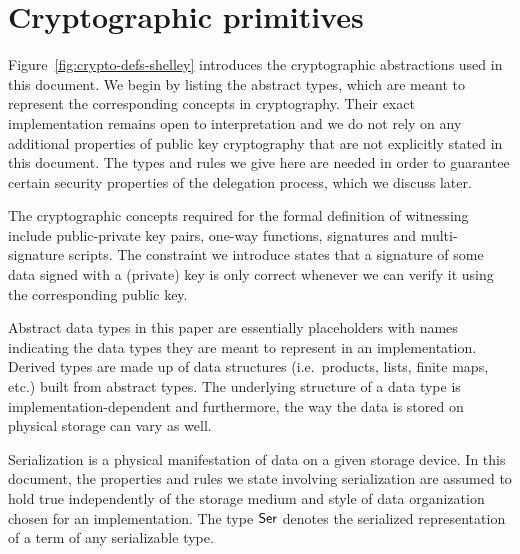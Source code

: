 \section{Cryptographic primitives}
\label{sec:crypto-primitives-shelley}

Figure~\ref{fig:crypto-defs-shelley} introduces the cryptographic abstractions used in
this document. We begin by listing the abstract types, which are meant to
represent the corresponding concepts in cryptography.
Their exact
implementation remains open to interpretation and we do not rely on
any additional properties of public key cryptography that are not explicitly stated
in this document. The types and rules we give here are needed in
order to guarantee certain security properties of the delegation process, which
we discuss later.

The cryptographic concepts required for the formal definition of witnessing
include public-private key pairs, one-way functions, signatures and
multi-signature scripts. The constraint we introduce states that a signature of
some data signed with a (private) key is only correct whenever we can verify it
using the corresponding public key.

Abstract data types in this paper are essentially placeholders with names
indicating the data types they are meant to represent in an implementation.
Derived types are made up of data structures (i.e.~products, lists, finite
maps, etc.) built from abstract types. The underlying structure of a data type
is implementation-dependent and furthermore, the way the data is stored on
physical storage can vary as well.

Serialization is a physical manifestation of data on a given storage device.
In this document, the properties and rules we state involving serialization are
assumed to hold true independently of the storage medium and style of data
organization chosen for an implementation.
The type $\mathsf{Ser}$ denotes the serialized representation of a term of any serializable
type.

